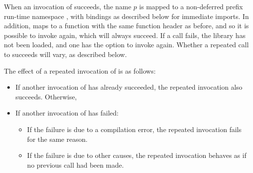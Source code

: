 \documentclass[makeidx]{article}
\begin{document}
{

\LMHash{}%
When an invocation of  succeeds,
the name $p$ is mapped to a non-deferred prefix run-time namespace
,
with bindings as described below for immediate imports.
In addition, 
maps  to a function with
the same function header as before,
and so it is possible to invoke  again,
which will always succeed.
If a call fails, the library has not been loaded,
and one has the option to invoke  again.
Whether a repeated call to  succeeds will vary,
as described below.


\LMHash{}%
The effect of a repeated invocation of  is as follows:
\begin{itemize}
\item
  If another invocation of  has already succeeded,
  the repeated invocation also succeeds.
  Otherwise,
\item
  If another invocation of  has failed:
  \begin{itemize}
  \item
    If the failure is due to a compilation error,
    the repeated invocation fails for the same reason.
  \item
    If the failure is due to other causes,
    the repeated invocation behaves as if no previous call had been made.
  \end{itemize}
\end{itemize}

\EndCase

}
\end{document}
